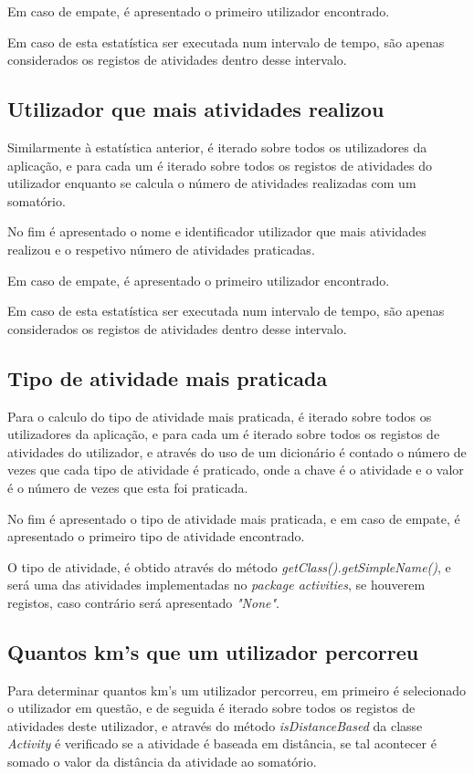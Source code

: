\documentclass[a4paper,12pt]{scrreprt}
\begin{document}
        Em caso de empate, é apresentado o primeiro utilizador encontrado.

        Em caso de esta estatística ser executada num intervalo de tempo,
        são apenas considerados os registos de atividades dentro desse intervalo.

    \subsection{Utilizador que mais atividades realizou}
        Similarmente à estatística anterior, é iterado sobre todos os utilizadores da aplicação,
        e para cada um é iterado sobre todos os registos de atividades do utilizador
        enquanto se calcula o número de atividades realizadas com um somatório.

        No fim é apresentado o nome e identificador utilizador que mais atividades realizou e
        o respetivo número de atividades praticadas.

        Em caso de empate, é apresentado o primeiro utilizador encontrado.

        Em caso de esta estatística ser executada num intervalo de tempo,
        são apenas considerados os registos de atividades dentro desse intervalo.

    \subsection{Tipo de atividade mais praticada}
        Para o calculo do tipo de atividade mais praticada, é iterado sobre todos os utilizadores da aplicação,
        e para cada um é iterado sobre todos os registos de atividades do utilizador,
        e através do uso de um dicionário é contado o número de vezes que cada tipo de atividade é praticado,
        onde a chave é o atividade e o valor é o número de vezes que esta foi praticada.

        No fim é apresentado o tipo de atividade mais praticada, e em caso de empate,
        é apresentado o primeiro tipo de atividade encontrado.

        O tipo de atividade, é obtido através do método \textit{getClass().getSimpleName()},
        e será uma das atividades implementadas no \textit{package activities}, se houverem registos,
        caso contrário será apresentado \textit{"None"}.

    \subsection{Quantos km's que um utilizador percorreu}
        Para determinar quantos km's um utilizador percorreu, em primeiro é selecionado o utilizador em questão,
        e de seguida é iterado sobre todos os registos de atividades deste utilizador,
        e através do método \textit{isDistanceBased} da classe \textit{Activity} é verificado se a atividade é baseada em distância,
        se tal acontecer é somado o valor da distância da atividade ao somatório.
\end{document}
